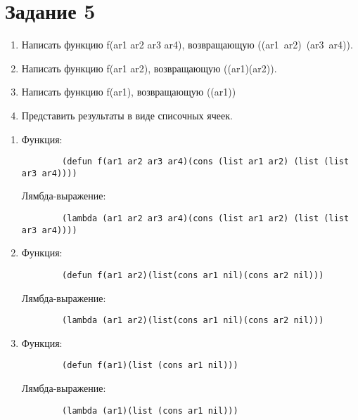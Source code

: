 \documentclass[a4paper,14pt, unknownkeysallowed]{extreport}
\begin{document}
\section*{Задание 5}

\begin{enumerate}[]
	\item Написать функцию f(ar1 ar2 ar3 ar4), возвращающую ((ar1~ar2)~(ar3~ar4)).
	\item Написать функцию f(ar1 ar2), возвращающую ((ar1)(ar2)).
	\item Написать функцию f(ar1), возвращающую ((ar1))
	\item Представить результаты в виде списочных ячеек.
\end{enumerate}


\begin{enumerate}[label=\arabic*.,wide=0pt]
	\item Функция:
	\begin{lstlisting}
		(defun f(ar1 ar2 ar3 ar4)(cons (list ar1 ar2) (list (list ar3 ar4))))
	\end{lstlisting}
	Лямбда-выражение:
	\begin{lstlisting}
		(lambda (ar1 ar2 ar3 ar4)(cons (list ar1 ar2) (list (list ar3 ar4))))
	\end{lstlisting}
	\item  Функция:
	\begin{lstlisting}
		(defun f(ar1 ar2)(list(cons ar1 nil)(cons ar2 nil)))
	\end{lstlisting}
	Лямбда-выражение:
	\begin{lstlisting}
		(lambda (ar1 ar2)(list(cons ar1 nil)(cons ar2 nil)))
	\end{lstlisting}
	\item  Функция:
	\begin{lstlisting}
		(defun f(ar1)(list (cons ar1 nil)))
	\end{lstlisting}
	Лямбда-выражение:
	\begin{lstlisting}
		(lambda (ar1)(list (cons ar1 nil)))
	\end{lstlisting}
\end{enumerate}

\FloatBarrier
\end{document}
